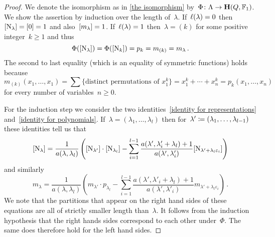 \documentclass[a4paper, 11pt, twoside=semi]{scrartcl}
\begin{document}
\begin{proof}
  We denote the isomorphism as in \cref{the isomorphism} by~$\Phi \colon \Lambda \to \mathbf{H}(Q, \mathbb{F}_1)$.
  We show the assertion by induction over the length of~$\lambda$.
  If~$\ell(\lambda) = 0$ then~$[\mathrm{N}_\lambda] = [0] = 1$ and also~$[m_\lambda] = 1$.
  If~$\ell(\lambda) = 1$ then~$\lambda = (k)$ for some positive integer~$k \geq 1$ and thus
  \[
    \Phi( [ \mathrm{N}_\lambda ] )
    =
    \Phi( [ \mathrm{N}_k ] )
    =
    p_k
    =
    m_{(k)}
    =
    m_\lambda \,.
  \]
  The second to last equality (which is an equality of symmetric functions) holds because
  \[
    m_{(k)}(x_1, \dotsc, x_1)
    =
    \sum \{ \text{distinct permutations of~$x_1^k$} \}
    =
    x_1^k + \dotsb + x_n^k
    =
    p_k(x_1, \dotsc, x_n)
  \]
  for every number of variables~$n \geq 0$.

  For the induction step we consider the two identities~\eqref{identity for representations} and~\eqref{identity for polynomials}.
  If~$\lambda = (\lambda_1, \dotsc, \lambda_l)$ then for~$\lambda' \coloneqq (\lambda_1, \dotsc, \lambda_{l-1})$ these identities tell us that
  \[ 
    [ \mathrm{N}_\lambda ]
    =
    \frac{1}{a(\lambda, \lambda_l)}
    \left(
      [ \mathrm{N}_{\lambda'} ]
      \cdot
      [ \mathrm{N}_{\lambda_l} ]
      -
      \sum_{i=1}^{l-1}
      \frac{ a(\lambda', \lambda'_i + \lambda_l) + 1 }{ a(\lambda', \lambda'_i) }
      [ \mathrm{N}_{\lambda' + \lambda_l \varepsilon_i} ]
    \right)
  \]
  and similarly
  \[
    m_\lambda
    =
    \frac{1}{a(\lambda, \lambda_l)}
    \left(
      m_{\lambda'} \cdot p_{\lambda_l}
      -
      \sum_{i=1}^{l-1}
      \frac{ a(\lambda', \lambda'_i + \lambda_l) + 1 }{ a(\lambda', \lambda'_i) } 
      m_{\lambda' + \lambda_l \varepsilon_i}
    \right) \,.
  \]
  We note that the partitions that appear on the right hand sides of these equations are all of strictly smaller length than~$\lambda$.
  It follows from the induction hypothesis that the right hands sides correspond to each other under~$\Phi$.
  The same does therefore hold for the left hand sides.
\end{proof}



\printbibliography
\end{document}
